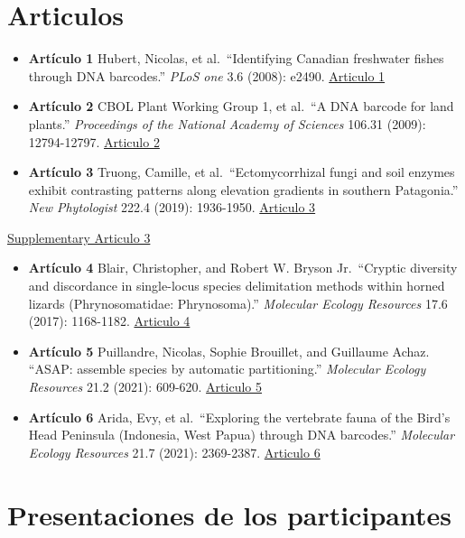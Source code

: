 \documentclass[
]{book}
\begin{document}
\hypertarget{articulos}{%
\section{Articulos}\label{articulos}}

\begin{itemize}
\item
  \textbf{Artículo 1} Hubert, Nicolas, et al.~``Identifying Canadian freshwater fishes through DNA barcodes.'' \emph{PLoS one} 3.6 (2008): e2490. \href{articulos/Articulo_1-Hubert_et_al_2008.pdf}{Articulo 1}
\item
  \textbf{Artículo 2} CBOL Plant Working Group 1, et al.~``A DNA barcode for land plants.'' \emph{Proceedings of the National Academy of Sciences} 106.31 (2009): 12794-12797. \href{articulos/Articulo_2-Hollingsworth_et_al_2009.pdf}{Articulo 2}
\item
  \textbf{Artículo 3} Truong, Camille, et al.~``Ectomycorrhizal fungi and soil enzymes exhibit contrasting patterns along elevation gradients in southern Patagonia.'' \emph{New Phytologist} 222.4 (2019): 1936-1950. \href{articulos/Articulo_3_Truong-knowfungi-2017.pdf}{Articulo 3}
\end{itemize}

\href{articulos/articulo3_90004204-sup-0001-SupInfo.pdf}{Supplementary Articulo 3}

\begin{itemize}
\item
  \textbf{Artículo 4} Blair, Christopher, and Robert W. Bryson Jr.~``Cryptic diversity and discordance in single-locus species delimitation methods within horned lizards (Phrynosomatidae: Phrynosoma).'' \emph{Molecular Ecology Resources} 17.6 (2017): 1168-1182. \href{articulos/Articulo_4-Blair_et_al_2017.pdf}{Articulo 4}
\item
  \textbf{Artículo 5} Puillandre, Nicolas, Sophie Brouillet, and Guillaume Achaz. ``ASAP: assemble species by automatic partitioning.'' \emph{Molecular Ecology Resources} 21.2 (2021): 609-620. \href{articulos/Articulo_5-Puillandre_et_al_2020.pdf}{Articulo 5}
\item
  \textbf{Artículo 6} Arida, Evy, et al.~``Exploring the vertebrate fauna of the Bird's Head Peninsula (Indonesia, West Papua) through DNA barcodes.'' \emph{Molecular Ecology Resources} 21.7 (2021): 2369-2387. \href{articulos/Articulo_6-Arida_et_al_2021.pdf}{Articulo 6}
\end{itemize}

\hypertarget{presentaciones-de-los-participantes}{%
\section{Presentaciones de los participantes}\label{presentaciones-de-los-participantes}}
\end{document}
